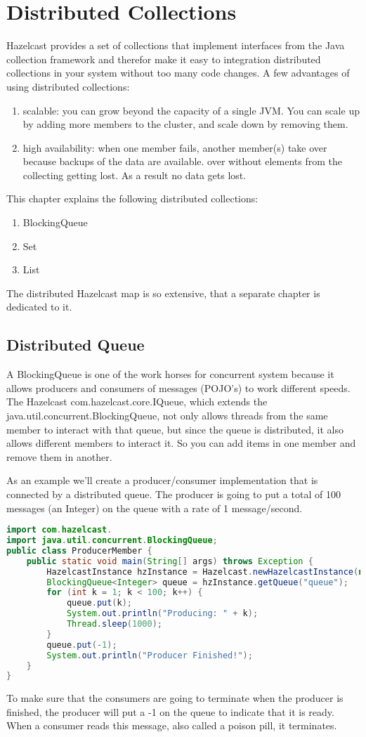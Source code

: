 \chapter{Distributed Collections}
Hazelcast provides a set of collections that implement interfaces from the Java collection framework and therefor make it easy to integration distributed collections in your system without too many code changes. A few advantages of using distributed collections:
\begin{enumerate}
\item scalable: you can grow beyond the capacity of a single JVM. You can scale up by adding more members to the cluster, and scale down by removing them.
\item high availability: when one member fails, another member(s) take over because backups of the data are available. over without elements from the collecting getting lost. As a result no data gets lost.
\end{enumerate}

This chapter explains the following distributed collections:
\begin{enumerate}
\item BlockingQueue
\item Set
\item List
\end{enumerate}
The distributed Hazelcast map is so extensive, that a separate chapter is dedicated to it. 

\section{Distributed Queue}
A BlockingQueue is one of the work horses for concurrent system because it allows producers and consumers of messages (POJO's) to work different speeds. The Hazelcast com.hazelcast.core.IQueue, which extends the java.util.concurrent.BlockingQueue, not only allows threads from the same member to interact with that queue, but since the queue is distributed, it also allows different members to interact it. So you can add items in one member and remove them in another.

As an example we'll create a producer/consumer implementation that is connected by a distributed queue. The producer is going to put a total of 100 messages (an Integer) on the queue with a rate of 1 message/second.
\begin{lstlisting}[language=java]
import com.hazelcast.
import java.util.concurrent.BlockingQueue;
public class ProducerMember {
    public static void main(String[] args) throws Exception {
        HazelcastInstance hzInstance = Hazelcast.newHazelcastInstance(null);
        BlockingQueue<Integer> queue = hzInstance.getQueue("queue");
        for (int k = 1; k < 100; k++) {
            queue.put(k);
            System.out.println("Producing: " + k);
            Thread.sleep(1000);
        }
        queue.put(-1);
        System.out.println("Producer Finished!");
    }
}
\end{lstlisting}
To make sure that the consumers are going to terminate when the producer is finished, the producer will put a -1 on the queue to indicate that it is ready. When a consumer reads this message, also called a poison pill, it terminates. 

